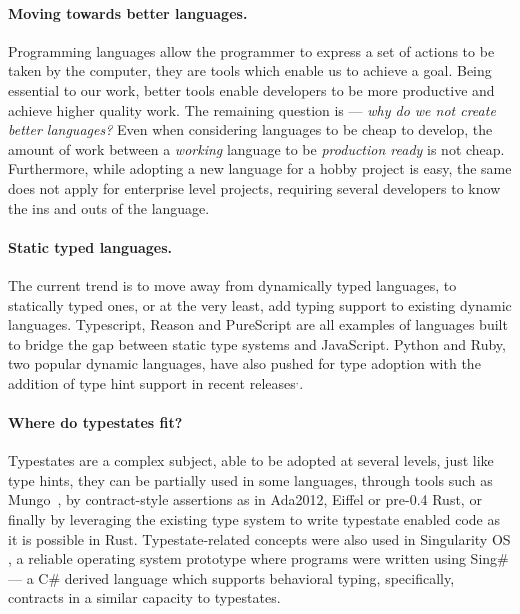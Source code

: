 \paragraph{Moving towards better languages.}
Programming languages allow the programmer to express a set of actions to be taken by the computer,
they are tools which enable us to achieve a goal.
Being essential to our work, better tools enable developers to be more productive and achieve higher quality work.
The remaining question is --- \emph{why do we not create better languages?}
Even when considering languages to be cheap to develop,
the amount of work between a \emph{working} language to be \emph{production ready} is not cheap.
Furthermore, while adopting a new language for a hobby project is easy,
the same does not apply for enterprise level projects,
requiring several developers to know the ins and outs of the language.

\paragraph{Static typed languages.}
The current trend is to move away from dynamically typed languages,
to statically typed ones, or at the very least, add typing support to existing dynamic languages.
Typescript,
Reason and
PureScript
are all examples of languages built to bridge the gap between static type systems and JavaScript.
Python and Ruby, two popular dynamic languages, have also pushed for type adoption
with the addition of type hint support in recent
releases$^,$.

\paragraph{Where do typestates fit?}
Typestates are a complex subject, able to be adopted at several levels,
just like type hints, they can be partially used in some languages,
through tools such as Mungo~\autocite{Voinea2020}, by contract-style assertions as in Ada2012, Eiffel or pre-0.4 Rust,
or finally by leveraging the existing type system to write typestate enabled code as it is possible in Rust.
Typestate-related concepts were also used in Singularity OS \autocite[Section 6]{Ancona2016},
a reliable operating system prototype where programs were written using Sing\# --- a C\# derived language which supports behavioral typing,
specifically, contracts in a similar capacity to typestates.

